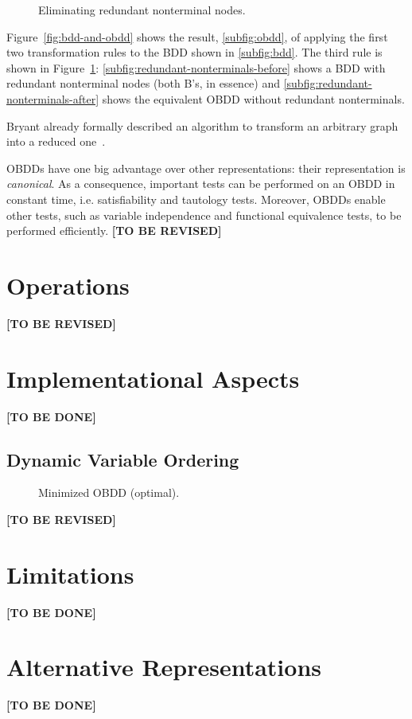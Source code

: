 \documentclass{vldb}
\newcommand{\tbr}{\textbf{[TO BE REVISED]}}
\newcommand{\tbd}{\textbf{[TO BE DONE]}}
\begin{document}
\begin{figure}[ht]
    \centering
    \subfigure[]{
        
        \label{subfig:redundant-nonterminals-before}
    }
    \hskip1cm
    \subfigure[]{
        
        \label{subfig:redundant-nonterminals-after}
    }
    \caption{Eliminating redundant nonterminal nodes.}
    \label{fig:redundant-nonterminals}
\end{figure}

Figure~\ref{fig:bdd-and-obdd} shows the result, \ref{subfig:obdd}, of applying
the first two transformation rules to the BDD shown in \ref{subfig:bdd}.
The third rule is shown in Figure~\ref{fig:redundant-nonterminals}:
\ref{subfig:redundant-nonterminals-before} shows a BDD with redundant
nonterminal nodes (both B's, in essence) and
\ref{subfig:redundant-nonterminals-after} shows the equivalent OBDD without
redundant nonterminals.

Bryant already formally described an algorithm to transform an arbitrary graph
into a reduced one~\cite[p. 683]{BRYANT86}. 

OBDDs have one big advantage over other representations: their representation is
\textit{canonical}. As a consequence, important tests can be performed on an OBDD
in constant time, i.e. satisfiability and tautology tests. Moreover, OBDDs enable
other tests, such as variable independence and functional equivalence tests, to
be performed efficiently. \tbr

\section{Operations}
\label{sec:operations}

\tbr

\section{Implementational Aspects}
\label{sec:implementation-aspects}

\tbd

\subsection{Dynamic Variable Ordering}
\label{subsec:dynamic-variable-ordering}

\begin{figure}[ht]
    \centering
    
    \label{fig:min-obdd}
    \caption{Minimized OBDD (optimal).}
\end{figure}
\tbr

\section{Limitations}
\label{sec:limitations}

\tbd

\section{Alternative Representations}
\label{sec:alternative-representations}

\tbd

\balance



\end{document}
